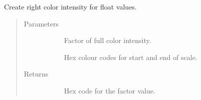 \documentclass[letterpaper,10pt,english]{sphinxmanual}
\begin{document}

\begin{fulllineitems}
\label{\detokenize{autoapi/src/plot/altair/index:src.plot.altair.lightness_scale}}
Create right color intensity for float values.
\begin{quote}\begin{description}
\item[{Parameters}] \leavevmode\begin{description}
\item[{}] \leavevmode
Factor of full color intensity.

\item[{}] \leavevmode
Hex colour codes for start and end of scale.

\end{description}

\item[{Returns}] \leavevmode\begin{description}
\item[{}] \leavevmode
Hex code for the factor value.

\end{description}

\end{description}\end{quote}

\end{fulllineitems}

\end{document}
